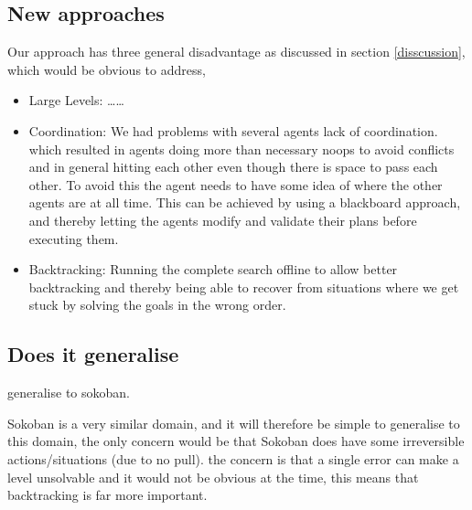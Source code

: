 \documentclass[letterpaper]{article}
\begin{document}
	\subsection{New approaches}
		Our approach has three general disadvantage as discussed in section \ref{disscussion}, which would be obvious to address,
		\begin{itemize}
			\item{Large Levels:}
				\dots \dots
			\item{Coordination:}
				We had problems with several agents lack of coordination. which resulted in agents doing more than necessary noops to avoid conflicts and in general hitting each other even though there is space to pass each other. To avoid this the agent needs to have some idea of where the other agents are at all time. This can be achieved by using a  blackboard approach, and thereby letting the agents modify and validate their plans before executing them.
			\item{Backtracking:}
				Running the complete search offline to allow better backtracking and thereby being able to recover from situations where we get stuck by solving the goals in the wrong order. 
		\end{itemize}

	\subsection{Does it generalise}
		
		
		generalise to sokoban.
		
		Sokoban is a very similar domain, and it will therefore be simple to generalise to this domain, the only concern would be that Sokoban does have some irreversible actions/situations (due to no pull). the concern is that a single error can make a level unsolvable and it would not be obvious at the time, this means that backtracking is far more important.
		



\end{document}
